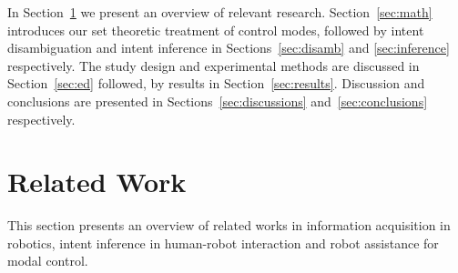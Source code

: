 \documentclass[letterpaper, 10 pt, conference]{ieeeconf}  %
\begin{document}

In Section~\ref{sec:related_work} we present an overview of relevant research. Section~\ref{sec:math} introduces our set theoretic treatment of control modes, followed by intent disambiguation and intent inference in Sections~\ref{sec:disamb} and \ref{sec:inference} respectively. The study design and experimental methods are discussed in Section~\ref{sec:ed} followed, by results in Section~\ref{sec:results}. Discussion and conclusions are presented in Sections~\ref{sec:discussions} and~\ref{sec:conclusions} respectively.  


\section{Related Work}\label{sec:related_work}
This section presents an overview of related works in information acquisition in robotics, intent inference in human-robot interaction and robot assistance for modal control. 
%
\end{document}
